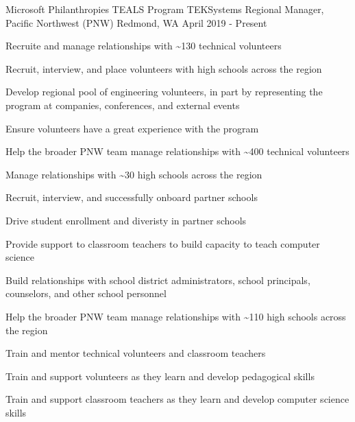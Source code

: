 \begin{cventries}

  \cventry
{Microsoft Philanthropies TEALS Program \newline TEKSystems}
    {Regional Manager, Pacific Northwest (PNW)}
    {Redmond, WA}
    {April 2019 - Present}
    {
      \begin{cvitems}
	\item Recruite and manage relationships with \~{}130 technical volunteers\\
	\begin{cvitems}
		\item Recruit, interview, and place volunteers with high schools across the region
		\item Develop regional pool of engineering volunteers, in part by representing the program at companies, conferences, and external events
		\item Ensure volunteers have a great experience with the program
		\item Help the broader PNW team manage relationships with \~{}400 technical volunteers
	\end{cvitems}
	\vspace{2mm}
	\item Manage relationships with \~{}30 high schools across the region\\
		\begin{cvitems}
		\item Recruit, interview, and successfully onboard partner schools
		\item Drive student enrollment and diveristy in partner schools
		\item Provide support to classroom teachers to build capacity to teach computer science
		\item Build relationships with school district administrators, school principals, counselors, and other school personnel
		\item Help the broader PNW team manage relationships with \~{}110 high schools across the region
	\end{cvitems}
	\vspace{2mm}
	\item Train and mentor technical volunteers and classroom teachers\\
		\begin{cvitems}
		\item Train and support volunteers as they learn and develop pedagogical skills
		\item Train and support classroom teachers as they learn and develop computer science skills

\end{cvitems}
\end{cvitems}}
\end{cventries}
